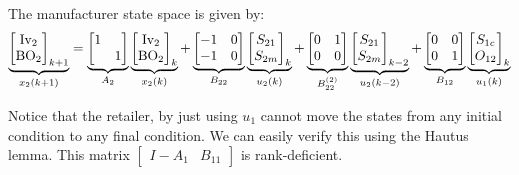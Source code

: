 The manufacturer state space is given by:
\begin{equation}
\label{eq:sc:scheduling_example:M}
\underbrace{\begin{bmatrix}\textrm{Iv}_2\\\textrm{BO}_2\end{bmatrix}_{k+1}}_{x_2(k+1)} =
\underbrace{\begin{bmatrix}1&\\ &
    1\end{bmatrix}}_{A_2}\underbrace{\begin{bmatrix}\textrm{Iv}_2\\\textrm{BO}_2\end{bmatrix}_k}_{x_2(k)}
+\underbrace{\begin{bmatrix}-1 & 0 \\-1&
    0 \end{bmatrix}}_{B_{22}}\underbrace{\begin{bmatrix}S_{21}\\S_{2m}\end{bmatrix}_k}_{u_2(k)}
+\underbrace{\begin{bmatrix}0 & 1 \\0&
    0 \end{bmatrix}}_{B_{22}^{(2)}}\underbrace{\begin{bmatrix}S_{21}\\S_{2m}\end{bmatrix}_{k-2}}_{u_2(k-2)}
+\underbrace{\begin{bmatrix} 0 & 0 \\0 &1\end{bmatrix}}_{B_{12}}\underbrace{\begin{bmatrix}S_{1c}\\O_{12}\end{bmatrix}_{k}}_{u_1(k)}
\end{equation}

Notice that the retailer, by just using $u_1$ cannot move the states
from any initial condition to any final condition. We can easily
verify this using the Hautus lemma. This matrix $\begin{bmatrix} I-A_1 & B_{11} \end{bmatrix}$ is
rank-deficient. 

